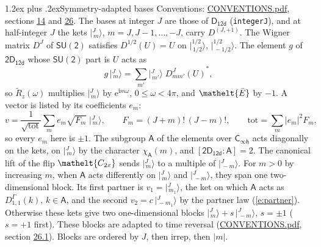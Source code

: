 \documentclass[10pt,a4paper]{article}
\makeatletter
\renewcommand\section{\@startsection{section}{1}{\z@}{-3ex plus -1ex minus -.2ex}%
  {1.2ex plus .2ex}{\normalfont\large\sffamily\bfseries\color{parttitle}}}
\numberwithin{equation}{section}
\newcommand{\eltfont}[1]{{\let\sigma\eltsigma\mathelt{#1}}}
\newcommand{\grp}[1]{\mathsf{#1}}
\newcommand{\elt}[1]{\eltfont{#1}}
\newcommand{\grpindex}[2]{[#1 : #2]}
\newcommand{\iunit}{\mathrm{i}}
\newcommand{\expe}{\mathrm{e}}
\newcommand{\irrJp}[2]{D^{(#1,#2)}}
\newcommand{\repD}[1]{D^{#1}}
\newcommand{\wignerD}[1]{D^{#1}}
\newcommand{\chiA}{\chi_{\grp{A}}}
\newcommand{\conj}[1]{{#1}^{*}}
\newcommand{\jm}[2]{\bigl\lvert{}^{#1}_{\,#2}\bigr\rangle}
\newcommand{\barred}[1]{\bar{#1}}
\newcommand{\lift}[1]{\tilde{#1}}
\makeatother
\begin{document}
\section{Symmetry-adapted bases}\label{s:bases}
Conventions: \href{../../CONVENTIONS.pdf}{CONVENTIONS.pdf}, sections \href{../../../rotation/CONVENTIONS.pdf\#conv.14}{14} and \href{../../CONVENTIONS.pdf\#conv.26}{26}.
\leavevmode\label{n:index.m}\label{n:vector.ket}The bases at integer $J$ are those of \href{../../../rotation/data/pdf/D12d.pdf}{$\grp{D_{12d}}$} (\texttt{integerJ}), and at half-integer $J$ the kets $\jm{J}{m}$, $m = J, J-1, \dots, -J$, carry $\irrJp{J}{+1}$. \label{n:matrix.wigner}The Wigner matrix $\wignerD{J}$ of $\grp{SU(2)}$ satisfies $\wignerD{1/2}(U) = U$ on $\jm{1/2}{1/2}$, $\jm{1/2}{-1/2}$. The element $g$ of $\grp{2D_{12d}}$ whose $\grp{SU(2)}$ part is $U$ acts as
\begin{equation}\label{e:action}g\,\jm{J}{m} = \sum_{m'} \jm{J}{m'}\; \conj{\wignerD{J}_{m m'}(U)},\end{equation}
so $\lift{R}_{z}(\omega)$ multiplies $\jm{J}{m}$ by $\expe^{\iunit m\omega}$, $0 \le \omega < 4\pi$, and $\elt{\barred{E}}$ by $-1$. \label{n:index.ketcoefficient}\label{n:vector.basis.symmetry}\label{n:index.ketweight}\label{n:index.total}A vector is listed by its coefficients $e_m$:
\begin{equation}\label{e:ket}v = \frac{1}{\sqrt{\mathrm{tot}}}\sum_m e_m\sqrt{F_m}\;\jm{J}{m},\qquad F_m = (J+m)!\,(J-m)!,\qquad \mathrm{tot} = \sum_m |e_m|^2F_m,\end{equation}
so every $e_m$ here is $\pm 1$.
\leavevmode\label{n:group.A}\label{n:function.character.abelian}The subgroup $\grp{A}$ of the elements over $\grp{C_{\infty h}}$ acts diagonally on the kets, on $\jm{J}{m}$ by the character $\chiA(m)$, and $\grpindex{\grp{2D_{12d}}}{\grp{A}} = 2$. The canonical lift of the flip $\elt{C_{2x}}$ sends $\jm{J}{m}$ to a multiple of $\jm{J}{-m}$. For $m > 0$ by increasing $m$, when $\grp{A}$ acts differently on $\jm{J}{m}$ and $\jm{J}{-m}$, they span one two-dimensional block. \label{n:index.partner.sign}Its first partner is $v_1 = \jm{J}{m_1}$, the ket on which $\grp{A}$ acts as $\repD{\Gamma}_{1,1}(k)$, $k \in \grp{A}$, and the second $v_2 = c\,\jm{J}{-m_1}$ by the partner law (\ref{e:partner}). \label{n:index.pair.sign}Otherwise these kets give two one-dimensional blocks $\jm{J}{m} + s\,\jm{J}{-m}$, $s = \pm 1$ ($s = +1$ first). These blocks are adapted to time reversal (\href{../../CONVENTIONS.pdf}{CONVENTIONS.pdf}, section \href{../../CONVENTIONS.pdf\#conv.26.1}{26.1}). Blocks are ordered by $J$, then irrep, then $|m|$.
\end{document}
